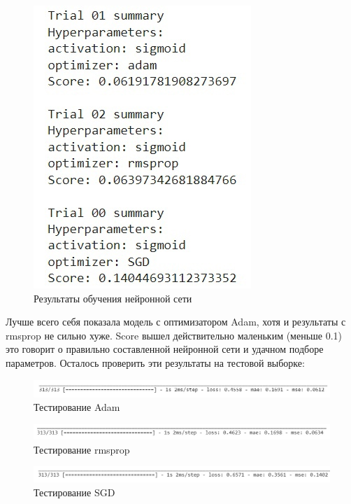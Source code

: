 \documentclass[bachelor, och, diploma]{SCWorks}
\begin{document}
\begin{figure}[ht!]

	\centering
	
	\includegraphics[width=0.3\linewidth]{pract1.png}
	
	\caption{Результаты обучения нейронной сети}
	
	\label{fig:p1}
	
\end{figure}

Лучше всего себя показала модель с оптимизатором Adam, хотя и результаты с rmsprop не сильно хуже. Score вышел действительно маленьким (меньше 0.1) это говорит о правильно составленной нейронной сети и удачном подборе параметров. Осталось проверить эти результаты на тестовой выборке:


\begin{figure}[ht!]

	\centering
	
	\includegraphics[width=0.8\linewidth]{pract2.png}
	
	\caption{Тестирование Adam}
	
	\label{fig:p2}
	
\end{figure}

\begin{figure}[ht!]

	\centering
	
	\includegraphics[width=0.8\linewidth]{pract3.png}
	
	\caption{Тестирование rmsprop}
	
	\label{fig:p3}
	
\end{figure}

\begin{figure}[ht!]

	\centering
	
	\includegraphics[width=0.8\linewidth]{pract4.png}
	
	\caption{Тестирование SGD}
	
	\label{fig:p4}
	
\end{figure}
\end{document}
